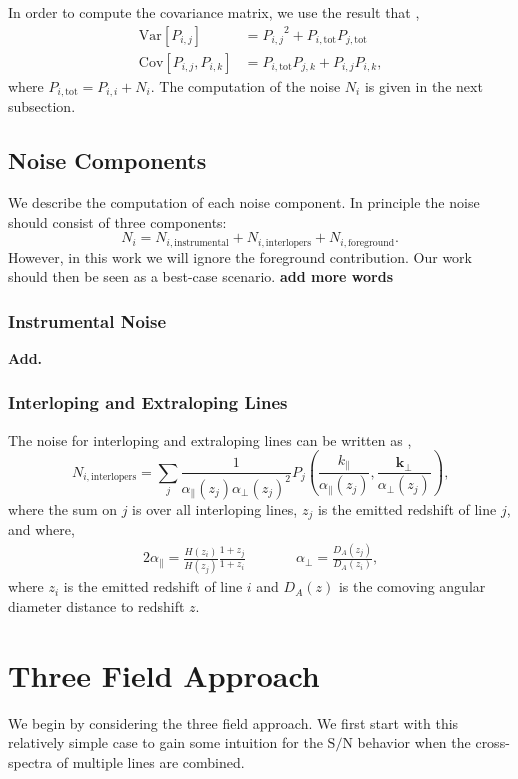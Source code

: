 \documentclass{aastex62}
\newcommand{\beq}{\begin{equation}}
\newcommand{\eeq}{\end{equation}}
\newcommand{\ps}[1]{\ensuremath{P_{#1,#1}}}
\newcommand{\xps}[2]{\ensuremath{P_{#1,#2}}}
\newcommand{\pstot}[1]{\ensuremath{P_{#1,\text{tot}}}}
\newcommand{\kpar}{k_{\parallel}}
\newcommand{\kperp}{\bm{k}_{\perp}}
\newcommand{\apar}{\alpha_{\parallel}}
\newcommand{\aperp}{\alpha_{\perp}}
\newcommand{\Var}[1]{\mathrm{Var}[#1]}
\newcommand{\Cov}[2]{\mathrm{Cov}[#1,#2]}
\newcommand{\SN}{\ensuremath{\text{S}/\text{N}}}
\begin{document}
In
order to compute the covariance matrix, we use the result that \citep[e.g.][]{2010JCAP...11..016V},
\beq\label{eq:var_cov}
\begin{split}
\Var{\xps{i}{j}} &= \xps{i}{j}^2 + \pstot{i}\pstot{j} \\
\Cov{\xps{i}{j}}{\xps{i}{k}} &= \pstot{i}\xps{j}{k} +
\xps{i}{j}\xps{i}{k}\text{,}
\end{split}
\eeq
where $\pstot{i} = \ps{i} + N_i$. The computation of the noise $N_i$ is given in the next subsection.

\subsection{Noise Components}\label{ssec:noise}
We describe the computation of each noise component. In principle the noise
should consist of three components:
\beq\label{eq:noise_comp}
N_i = N_{i,\text{instrumental}} + N_{i,\text{interlopers}} + N_{i,\text{foreground}}\text{.}
\eeq
However, in this work we will ignore the foreground contribution. Our work
should then be seen as a best-case scenario. {\bf add more words}

\subsubsection{Instrumental Noise}\label{sssec:instrumental}
{\bf Add.}

\subsubsection{Interloping and Extraloping Lines}\label{sssec:interlopers}
The noise for interloping and extraloping lines can be written as
\citep{2016ApJ...825..143L, 2016ApJ...832..165C},
\beq\label{eq:ptot_intlpr}
N_{i,\text{interlopers}} = \sum_{j} \frac{1}{\apar(z_j) \aperp(z_j)^2} 
            P_j\left(\frac{\kpar}{\apar(z_j)}, 
                     \frac{\kperp}{\aperp(z_j)}\right)\text{,}
\eeq
where the sum on $j$ is over all interloping lines, $z_j$ is the
emitted redshift of line $j$, and where,
\begin{alignat}{2}
\apar = \frac{H(z_i)}{H(z_j)} \frac{1+z_j}{1+z_i} \quad \quad &&
\aperp = \frac{D_{A}(z_j)}{D_A(z_i)}\text{,}
\end{alignat}
where $z_i$ is the emitted redshift of line $i$ and $D_A(z)$ is the comoving
angular diameter distance to redshift $z$.

\section{Three Field Approach}\label{sec:tf}
We begin by considering the three field approach. We first start with this
relatively simple case to gain some intuition for the \SN{} behavior when the
cross-spectra of multiple lines are combined.
\end{document}
